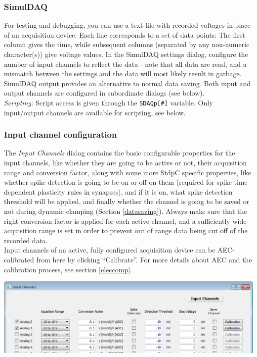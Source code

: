 \documentclass{article}
\begin{document}
\subsubsection{SimulDAQ}
For testing and debugging, you can use a text file with recorded voltages in place of
an acquisition device. Each line corresponds to a set of data points: The first column
gives the time, while subsequent columns (separated by any non-numeric character(s)) give
voltage values. In the SimulDAQ settings dialog, configure the number of input channels
to reflect the data - note that all data are read, and a mismatch between the settings and
the data will most likely result in garbage. SimulDAQ output provides an alternative to
normal data saving. Both input and output channels are configured in subordinate dialogs (see below).
\\
\emph{Scripting:} Script access is given through the \texttt{SDAQp[\#]} variable.
Only input/output channels are available for scripting, see below.

\subsubsection{Input channel configuration} \label{inchnconfig}

The \emph{Input Channels} dialog contains the basic configurable properties
for the input channels, like whether they are going to be active or not,
their acquisition range and conversion factor, along with some more StdpC specific
properties, like whether spike detection is going to be on or
off on them (required for spike-time dependent plasticity rules in synapses), and if it is on, what spike
detection threshold will be applied, and finally whether the channel is
going to be saved or not during dynamic clamping (Section \ref{datasaving}). Always make sure that the
right conversion factor is applied for each active channel, and a
sufficiently wide acquisition range is set in order to prevent out of range
data being cut off of the recorded data. \\
Input channels of an active, fully configured acquisition device can be AEC-calibrated from here by
clicking ``Calibrate''. For more details about AEC and the calibration process, see section \ref{eleccomp}.\\

\noindent
\parbox{\textwidth}{
	\includegraphics[scale=0.5]{inputChnDialog}
} \\[0.2cm]
\end{document}
